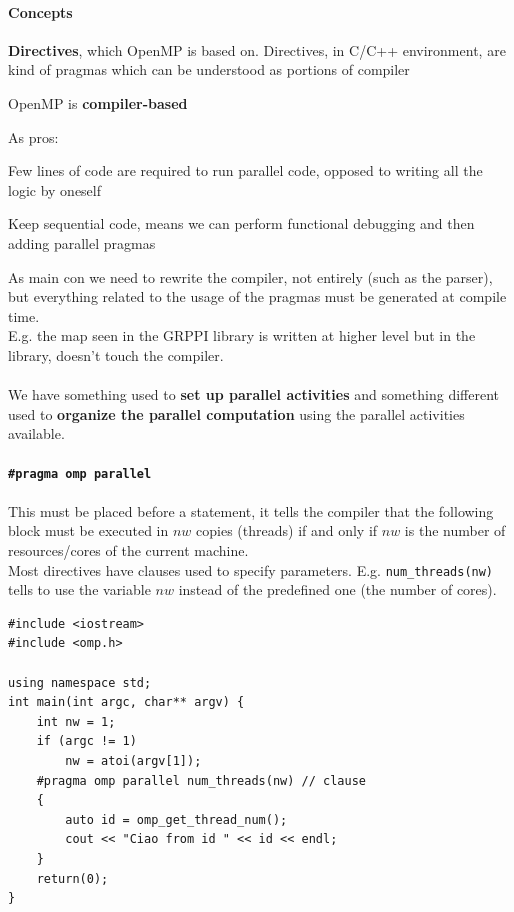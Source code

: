\documentclass[10pt]{report}
\begin{document}
\paragraph{Concepts}\begin{list}{}{}
	\item \textbf{Directives}, which OpenMP is based on. Directives, in C/C++ environment, are kind of pragmas which can be understood as portions of compiler
	\item OpenMP is \textbf{compiler-based}
	
\end{list}
As pros:
\begin{list}{}{}
	\item Few lines of code are required to run parallel code, opposed to writing all the logic by oneself
	\item Keep sequential code, means we can perform functional debugging and then adding parallel pragmas
\end{list}
As main con we need to rewrite the compiler, not entirely (such as the parser), but everything related to the usage of the pragmas must be generated at compile time.\\
E.g. the map seen in the GRPPI library is written at higher level but in the library, doesn't touch the compiler.\\\\
We have something used to \textbf{set up parallel activities} and something different used to \textbf{organize the parallel computation} using the parallel activities available.
\paragraph{\texttt{\#pragma omp parallel}} This must be placed before a statement, it tells the compiler that the following block must be executed in $nw$ copies (threads) if and only if $nw$ is the number of resources/cores of the current machine.\\
Most directives have clauses used to specify parameters. E.g. \texttt{num\_threads(nw)} tells to use the variable $nw$ instead of the predefined one (the number of cores).
\begin{lstlisting}[style=myC]
#include <iostream>
#include <omp.h>

using namespace std;
int main(int argc, char** argv) {
	int nw = 1;
	if (argc != 1)
		nw = atoi(argv[1]);
	#pragma omp parallel num_threads(nw) // clause
	{
		auto id = omp_get_thread_num();
		cout << "Ciao from id " << id << endl;
	}
	return(0);
}
\end{lstlisting}
\end{document}
